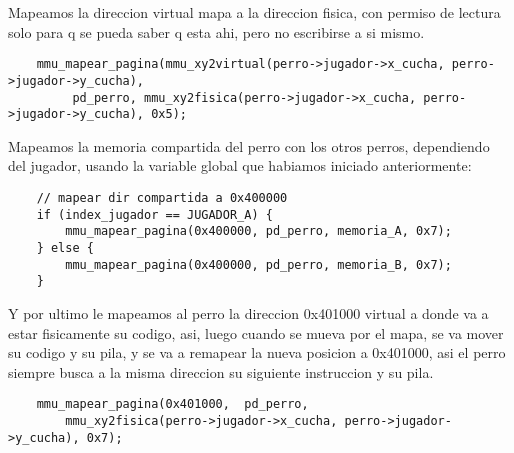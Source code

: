 Mapeamos la direccion virtual mapa a la direccion fisica, con permiso de lectura solo para q se pueda saber q esta ahi, pero no escribirse a si mismo.
\begin{codesnippet}
\begin{verbatim}
    mmu_mapear_pagina(mmu_xy2virtual(perro->jugador->x_cucha, perro->jugador->y_cucha),
    	 pd_perro, mmu_xy2fisica(perro->jugador->x_cucha, perro->jugador->y_cucha), 0x5);
    \end{verbatim}
\end{codesnippet}

Mapeamos la memoria compartida del perro con los otros perros, dependiendo del jugador, usando la variable global que habiamos iniciado anteriormente:
\begin{codesnippet}
\begin{verbatim}
    // mapear dir compartida a 0x400000
    if (index_jugador == JUGADOR_A) {
        mmu_mapear_pagina(0x400000, pd_perro, memoria_A, 0x7);
    } else {
        mmu_mapear_pagina(0x400000, pd_perro, memoria_B, 0x7);
    }
    \end{verbatim}
\end{codesnippet}


   Y por ultimo le mapeamos al perro la direccion 0x401000 virtual a donde va a estar fisicamente su codigo, asi, luego cuando se mueva por el mapa, se va mover su codigo y su pila, y se va a remapear la nueva posicion a 0x401000, asi el perro siempre busca a la misma direccion su siguiente instruccion y su pila.
   \begin{codesnippet}
\begin{verbatim}
    mmu_mapear_pagina(0x401000,  pd_perro, 
    	mmu_xy2fisica(perro->jugador->x_cucha, perro->jugador->y_cucha), 0x7);
    \end{verbatim}
\end{codesnippet}
